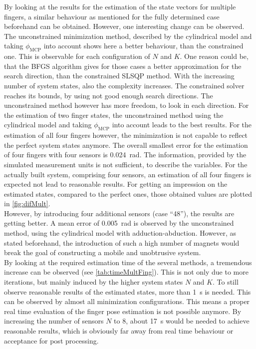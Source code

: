 By looking at the results for the estimation of the state vectors for multiple fingers, a similar behaviour as mentioned for the fully determined case beforehand can be obtained. However, one interesting change can be observed. The unconstrained minimization method, described by the cylindrical model and taking $ \phi_{\mathrm{MCP}} $ into account shows here a better behaviour, than the constrained one. This is observable for each configuration of $ N $ and $ K $. One reason could be, that the \ac{BFGS} algorithm gives for those cases a better approximation for the search direction, than the constrained \ac{SLSQP} method. With the increasing number of system states, also the complexity increases. The constrained solver reaches its bounds, by using not good enough search directions. The unconstrained method however has more freedom, to look in each direction. For the estimation of two finger states, the unconstrained method using the cylindrical model and taking $ \phi_{\mathrm{MCP}} $ into account leads to the best results. For the estimation of all four fingers however, the minimization is not capable to reflect the perfect system states anymore. The overall smallest error for the estimation of four fingers with four sensors is \SI{0.024}{\radian}. The information, provided by the simulated measurement units is not sufficient, to describe the variables. For the actually built system, comprising four sensors, an estimation of all four fingers is expected not lead to reasonable results. For getting an impression on the estimated states, compared to the perfect ones, those obtained values are plotted in \ref{fig:difMult}. \\
However, by introducing four additional sensors (case ``48''), the results are getting better. A mean error of \SI{0.005}{\radian} is observed by the unconstrained method, using the cylindrical model with adduction-abduction. However, as stated beforehand, the introduction of such a high number of magnets would break the goal of constructing a mobile and unobtrusive system. \\
By looking at the required estimation time of the several methods, a tremendous increase can be observed (see \ref{tab:timeMultFing}). This is not only due to more iterations, but mainly induced by the higher system states $ N $ and $ K $. To still observe reasonable results of the estimated states, more than \SI{1}{\second} is needed. This can be observed by almost all minimization configurations. This means a proper real time evaluation of the finger pose estimation is not possible anymore. By increasing the number of sensors $ N $ to 8, about \SI{17}{\second} would be needed to achieve reasonable results, which is obviously far away from real time behaviour or acceptance for post processing. \\
